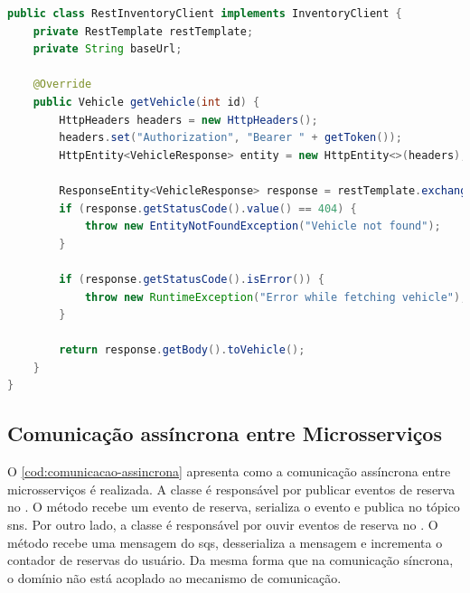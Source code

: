 \begin{codigo}[H]
    \begin{lstlisting}[language=Java]
public class RestInventoryClient implements InventoryClient {
    private RestTemplate restTemplate;
    private String baseUrl;

    @Override
    public Vehicle getVehicle(int id) {
        HttpHeaders headers = new HttpHeaders();
        headers.set("Authorization", "Bearer " + getToken());
        HttpEntity<VehicleResponse> entity = new HttpEntity<>(headers);

        ResponseEntity<VehicleResponse> response = restTemplate.exchange(baseUrl + "/vehicles/{id}", HttpMethod.GET, entity, VehicleResponse.class, id);
        if (response.getStatusCode().value() == 404) {
            throw new EntityNotFoundException("Vehicle not found");
        }

        if (response.getStatusCode().isError()) {
            throw new RuntimeException("Error while fetching vehicle");
        }

        return response.getBody().toVehicle();
    }
}
    \end{lstlisting}
    \caption{Método para obter um veículo do }
    \label{cod:rest-inventory-client}
\end{codigo}

\subsection{Comunicação assíncrona entre Microsserviços}
O \autoref{cod:comunicacao-assincrona} apresenta como a comunicação assíncrona entre microsserviços é realizada. A classe  é responsável por publicar eventos de reserva no . O método  recebe um evento de reserva, serializa o evento e publica no tópico \acrshort{sns}. Por outro lado, a classe  é responsável por ouvir eventos de reserva no . O método  recebe uma mensagem do \acrshort{sqs}, desserializa a mensagem e incrementa o contador de reservas do usuário. Da mesma forma que na comunicação síncrona, o domínio não está acoplado ao mecanismo de comunicação.

